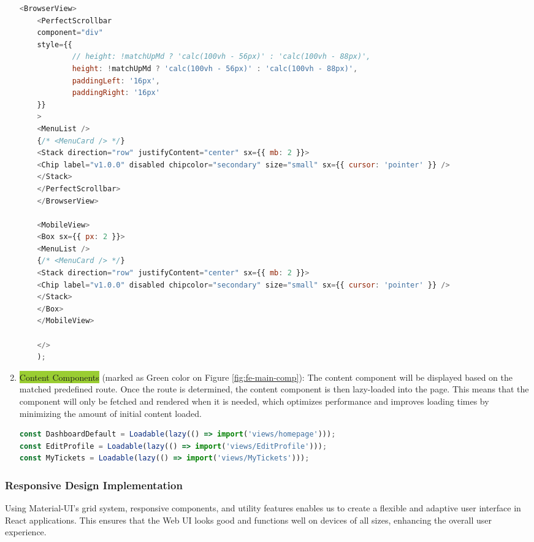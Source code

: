 \begin{enumerate}
\begin{lstlisting}[language=Javascript, breaklines=true, caption=Frontend Sidebar Component]
	<BrowserView>
	<PerfectScrollbar
	component="div"
	style={{
			// height: !matchUpMd ? 'calc(100vh - 56px)' : 'calc(100vh - 88px)',
			height: !matchUpMd ? 'calc(100vh - 56px)' : 'calc(100vh - 88px)',
			paddingLeft: '16px',
			paddingRight: '16px'
	}}
	>
	<MenuList />
	{/* <MenuCard /> */}
	<Stack direction="row" justifyContent="center" sx={{ mb: 2 }}>
	<Chip label="v1.0.0" disabled chipcolor="secondary" size="small" sx={{ cursor: 'pointer' }} />
	</Stack>
	</PerfectScrollbar>
	</BrowserView>
	
	<MobileView>
	<Box sx={{ px: 2 }}>
	<MenuList />
	{/* <MenuCard /> */}
	<Stack direction="row" justifyContent="center" sx={{ mb: 2 }}>
	<Chip label="v1.0.0" disabled chipcolor="secondary" size="small" sx={{ cursor: 'pointer' }} />
	</Stack>
	</Box>
	</MobileView>
	
	</>
	);
\end{lstlisting}		
		
		
		
		
		
		\item  \colorbox{YellowGreen}{Content Components} (marked as Green color on Figure \ref{fig:fe-main-comp}): The content component will be displayed based on the matched predefined route. Once the route is determined, the content component is then lazy-loaded into the page. This means that the component will only be fetched and rendered when it is needed, which optimizes performance and improves loading times by minimizing the amount of initial content loaded.
		
		
\begin{lstlisting}[language=Javascript, breaklines=true, caption=Example of Lazy Loading Frontend Components]
const DashboardDefault = Loadable(lazy(() => import('views/homepage')));
const EditProfile = Loadable(lazy(() => import('views/EditProfile')));
const MyTickets = Loadable(lazy(() => import('views/MyTickets')));
\end{lstlisting}	
		
	\end{enumerate}
	
	
	\subsubsection{Responsive Design Implementation}
	Using Material-UI's grid system, responsive components, and utility features enables us to create a flexible and adaptive user interface in React applications. This ensures that the Web UI looks good and functions well on devices of all sizes, enhancing the overall user experience.
	
